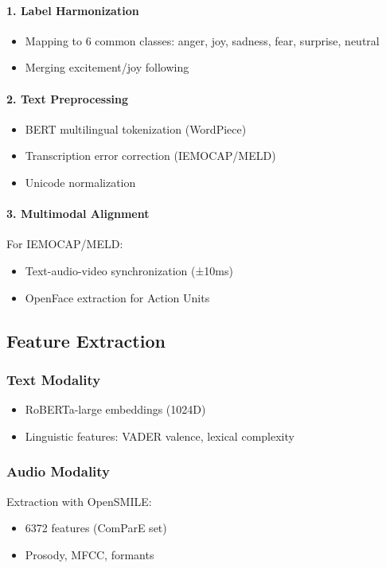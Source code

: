 \documentclass[a4paper,11pt]{article}
\begin{document}
\paragraph{1. Label Harmonization}
\begin{itemize}
    \item Mapping to 6 common classes: anger, joy, sadness, fear, surprise, neutral
    \item Merging excitement/joy following \cite{zhang2023survey}
\end{itemize}

\paragraph{2. Text Preprocessing}
\begin{itemize}
    \item BERT multilingual tokenization (WordPiece)
    \item Transcription error correction (IEMOCAP/MELD)
    \item Unicode normalization
\end{itemize}

\paragraph{3. Multimodal Alignment}
For IEMOCAP/MELD:
\begin{itemize}
    \item Text-audio-video synchronization (±10ms)
    \item OpenFace extraction for Action Units
\end{itemize}

\subsection{Feature Extraction}
\subsubsection{Text Modality}
\begin{itemize}
    \item RoBERTa-large embeddings (1024D)
    \item Linguistic features: VADER valence, lexical complexity
\end{itemize}

\subsubsection{Audio Modality}
Extraction with OpenSMILE:
\begin{itemize}
    \item 6372 features (ComParE set)
    \item Prosody, MFCC, formants
\end{itemize}
\end{document}
